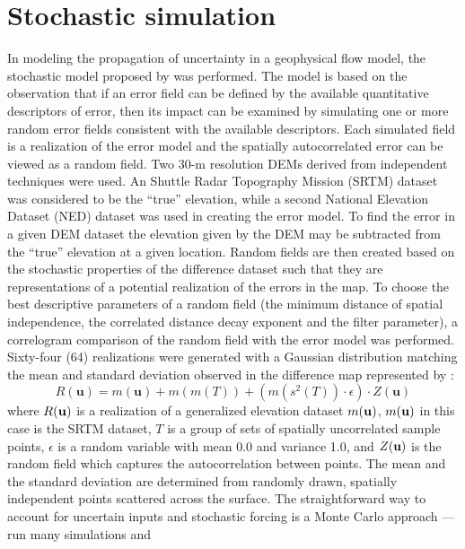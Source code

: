 \documentclass[a4paper,fleqn]{article}
\begin{document}
\section{Stochastic simulation}

In modeling the propagation of uncertainty in a geophysical flow
model, the stochastic model proposed by \citet{Ehlschlaeger_1996} was
performed. The model is based on the observation that if an error
field can be defined by the available quantitative descriptors of
error, then its impact can be examined by simulating one or more
random error fields consistent with the available descriptors. Each
simulated field is a realization of the error model and the spatially
autocorrelated error can be viewed as a random field.
Two 30-m resolution DEMs derived from independent techniques were
used. An Shuttle Radar Topography Mission (SRTM) dataset was considered to be the ``true'' elevation,
while a second National Elevation Dataset (NED) dataset was used in creating the error model. To
find the error in a given DEM dataset the elevation given by the DEM
may be subtracted from the ``true'' elevation at a given
location. Random fields are then created based on the stochastic
properties of the difference dataset such that they are
representations of a potential realization of the errors in the map.
To choose the best descriptive parameters of a random field (the
minimum distance of spatial independence, the correlated distance
decay exponent and the filter parameter), a correlogram comparison of
the random field with the error model was performed. Sixty-four (64)
realizations were generated with a Gaussian distribution matching the
mean and standard deviation observed in the difference map represented
by \citep{Ehlschlaeger_1996}:
\begin{equation}
 R(\textbf{u})=m(\textbf{u})+m(m(T))+(m(s^2(T))\cdot \epsilon)\cdot Z(\textbf{u})
\label{eq:one}
\end{equation} 
where $R(\bf{u})$ is a realization of a generalized elevation dataset
$m(\bf{u})$,  $m(\bf{u})$ in this case is the SRTM dataset, $T$ is a group of sets
 of spatially uncorrelated sample
points, $\epsilon$ is a random variable with mean 0.0 and variance
1.0, and $Z(\bf{u})$ is the random field which captures the
autocorrelation between points.  The mean and the standard deviation
are determined from randomly drawn, spatially independent points
scattered across the surface.
The straightforward way to account for uncertain inputs and stochastic
forcing is a Monte Carlo approach --- run many simulations and
\end{document}
